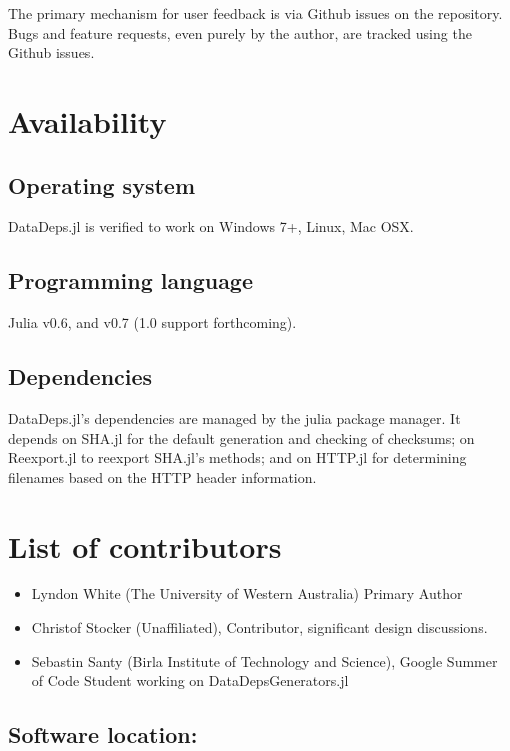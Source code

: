 \documentclass[dvinames]{josr}
\begin{document}
The primary mechanism for user feedback is via Github issues on the repository.
Bugs and feature requests, even purely by the author, are tracked using the Github issues.


\section{Availability}
\subsection{Operating system}
DataDeps.jl is verified to work on Windows 7+, Linux, Mac OSX.

\subsection{Programming language}
Julia v0.6, and v0.7 (1.0 support forthcoming).

\subsection{Dependencies}
DataDeps.jl's dependencies are managed by the julia package manager.
It depends on SHA.jl for the default generation and checking of checksums; 
on Reexport.jl to reexport SHA.jl's methods;
and on HTTP.jl for determining filenames based on the HTTP header information.

\section*{List of contributors}
\begin{itemize}
	\item Lyndon White (The University of Western Australia) Primary Author
	\item Christof Stocker (Unaffiliated), Contributor, significant design discussions.
	\item Sebastin Santy (Birla Institute of Technology and Science), Google Summer of Code Student working on DataDepsGenerators.jl
	
\end{itemize}

\subsection{Software location:}
\end{document}
